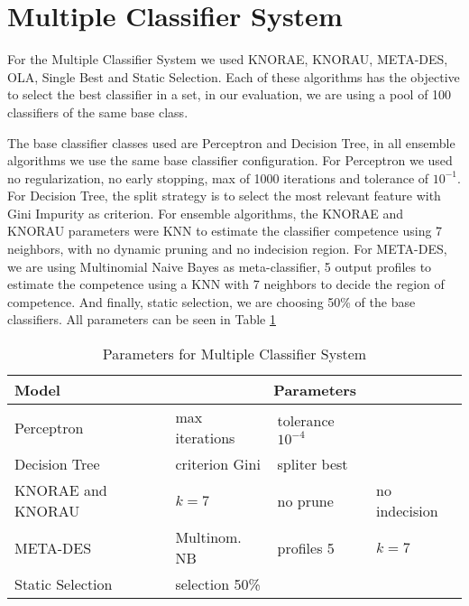 \section{Multiple Classifier System}\label{mcs}

For the Multiple Classifier System we used KNORAE, KNORAU, META-DES, OLA, Single Best and Static Selection. Each of these algorithms has the objective to select the best classifier in a set, in our evaluation, we are using a pool of 100 classifiers of the same base class.

The base classifier classes used are Perceptron and Decision Tree, in all ensemble algorithms we use the same base classifier configuration. For Perceptron we used no regularization, no early stopping, max of 1000 iterations and tolerance of $10^{-1}$. For Decision Tree, the split strategy is to select the most relevant feature with Gini Impurity as criterion. For ensemble algorithms, the KNORAE and KNORAU parameters were KNN to estimate the classifier competence using 7 neighbors, with no dynamic pruning and no indecision region. For META-DES, we are using Multinomial Naive Bayes as meta-classifier, 5 output profiles to estimate the competence using a KNN with 7 neighbors to decide the region of competence. And finally, static selection, we are choosing 50\% of the base classifiers. All parameters can be seen in Table \ref{table:mcs_params}

\begin{table}[h!]
    \centering
    \renewcommand{\arraystretch}{1.8}
    \begin{tabular}{ p{5cm}p{3cm}|p{3cm}|p{3cm} }
        \toprule
        Model & \multicolumn{3}{c}{Parameters} \\
        \midrule
        Perceptron & max iterations \newline 1000 & tolerance $10^{-4}$ & \\
        Decision Tree & criterion Gini & spliter best & \\
        \midrule
        KNORAE and KNORAU & $k = 7$ & no prune & no indecision \\
        META-DES & Multinom. NB & profiles 5 & $k = 7$ \\
        Static Selection & selection 50\% & & \\
        \bottomrule
        \end{tabular}
        \caption{%
        Parameters for Multiple Classifier System%
        }\label{table:mcs_params}
\end{table}

